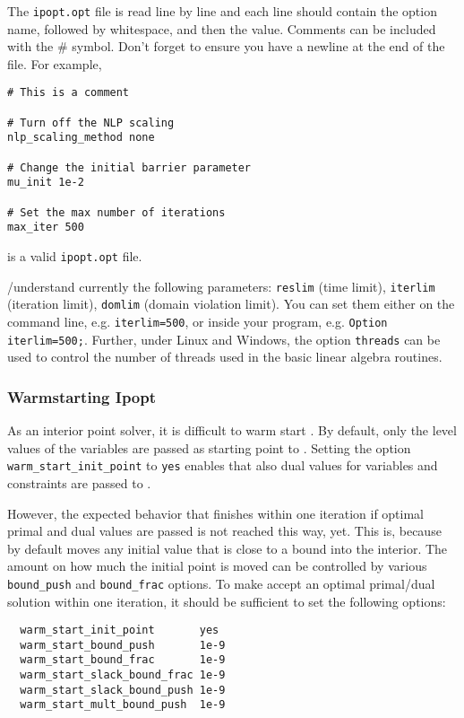 The \texttt{ipopt.opt} file is read line by line and each line should contain the option name, followed by whitespace, and then the value.
Comments can be included with the \# symbol. Don't forget to ensure you have a newline at the end of the file. For example,
\begin{verbatim}
# This is a comment

# Turn off the NLP scaling
nlp_scaling_method none

# Change the initial barrier parameter
mu_init 1e-2

# Set the max number of iterations
max_iter 500
\end{verbatim}
is a valid \texttt{ipopt.opt} file.


\GAMS/\IPOPT understand currently the following \GAMS parameters: \texttt{reslim} (time limit), \texttt{iterlim} (iteration limit), \texttt{domlim} (domain violation limit).
You can set them either on the command line, e.g. \verb+iterlim=500+, or inside your \GAMS program, e.g. \verb+Option iterlim=500;+.
Further, under Linux and Windows, the option \texttt{threads} can be used to control the number of threads used in the basic linear algebra routines.

\subsubsection{Warmstarting Ipopt}

As an interior point solver, it is difficult to warm start \IPOPT.
By default, only the level values of the variables are passed as starting point to \IPOPT.
Setting the \IPOPT option \texttt{warm\_start\_init\_point} to \texttt{yes} enables that also dual values for variables and constraints are passed to \IPOPT.

However, the expected behavior that \IPOPT finishes within one iteration if optimal primal and dual values are passed is not reached this way, yet. This is, because \IPOPT by default moves any initial value that is close to a bound into the interior. The amount on how much the initial point is moved can be controlled by various \texttt{bound\_push} and \texttt{bound\_frac} options.
To make \IPOPT accept an optimal primal/dual solution within one iteration, it should be sufficient to set the following options:
\begin{verbatim}
  warm_start_init_point       yes
  warm_start_bound_push       1e-9
  warm_start_bound_frac       1e-9
  warm_start_slack_bound_frac 1e-9
  warm_start_slack_bound_push 1e-9
  warm_start_mult_bound_push  1e-9
\end{verbatim}

